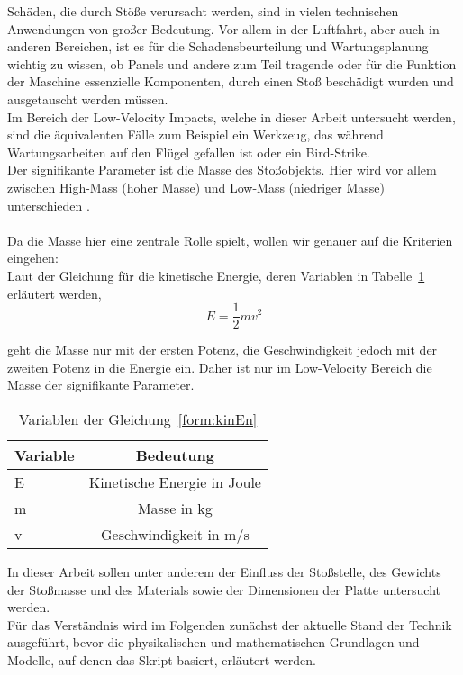 Schäden, die durch Stöße verursacht werden, sind in vielen technischen
Anwendungen von großer Bedeutung. Vor allem in der Luftfahrt, aber auch in
anderen Bereichen, ist es für die Schadensbeurteilung und Wartungsplanung
wichtig zu wissen, ob Panels und andere zum Teil tragende oder für die Funktion
der Maschine essenzielle Komponenten, durch einen Stoß beschädigt wurden und
ausgetauscht werden müssen. \\
Im Bereich der Low-Velocity Impacts, welche in dieser Arbeit untersucht werden,
sind die äquivalenten Fälle zum Beispiel ein Werkzeug, das während
Wartungsarbeiten auf den Flügel gefallen ist oder ein Bird-Strike. \\
Der signifikante Parameter ist die Masse des Stoßobjekts. Hier wird vor allem
zwischen High-Mass (hoher Masse) und Low-Mass (niedriger Masse) unterschieden \cite{Olsson.2000}. \\
\\
Da die Masse hier eine zentrale Rolle spielt, wollen wir genauer auf die
Kriterien eingehen: \\
Laut der Gleichung für die kinetische Energie, deren Variablen in Tabelle~\ref{tab:Tabelle 1} erläutert werden,
\begin{equation}
\label{form:kinEn}
E = \frac{1}{2}mv^2
\end{equation}
 
 geht die Masse nur mit der ersten Potenz, die Geschwindigkeit jedoch mit
 der zweiten Potenz in die Energie ein. Daher ist nur im Low-Velocity Bereich die Masse der signifikante Parameter. 
 
\begin{table}[h!]
	\begin{center}
		\caption{Variablen der Gleichung~\ref{form:kinEn}}
		\label{tab:Tabelle 1}
		\begin{tabular}{l|c}
			\textbf{Variable} & \textbf{Bedeutung}\\
			\hline
			E & Kinetische Energie in Joule\\
			m & Masse in kg\\
			v & Geschwindigkeit in m/s\\
		\end{tabular}
	\end{center}
\end{table}

In dieser Arbeit sollen unter anderem der Einfluss der
Stoßstelle, des Gewichts der Stoßmasse und des Materials sowie der Dimensionen der
Platte untersucht werden. \\
Für das Verständnis wird im Folgenden zunächst der aktuelle Stand der
Technik ausgeführt, bevor die physikalischen und mathematischen Grundlagen und
Modelle, auf denen das Skript basiert, erläutert werden.\\
\\

